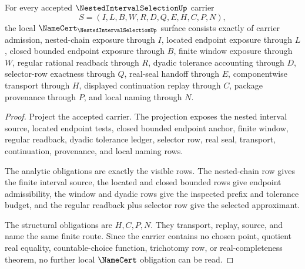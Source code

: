 \begin{theorem}
\label{thm:nested-interval-selection-namecert-obligations}
For every accepted $\NestedIntervalSelectionUp$ carrier
$$
S=(I,L,B,W,R,D,Q,E,H,C,P,N),
$$
the local $\NameCert_{\NestedIntervalSelectionUp}$ surface consists exactly of carrier admission, nested-chain exposure through $I$, located endpoint exposure through $L$, closed bounded endpoint exposure through $B$, finite window exposure through $W$, regular rational readback through $R$, dyadic tolerance accounting through $D$, selector-row exactness through $Q$, real-seal handoff through $E$, componentwise transport through $H$, displayed continuation replay through $C$, package provenance through $P$, and local naming through $N$.
\end{theorem}
\begin{proof}
Project the accepted carrier. The projection exposes the nested interval source, located endpoint tests, closed bounded endpoint anchor, finite window, regular readback, dyadic tolerance ledger, selector row, real seal, transport, continuation, provenance, and local naming rows.

The analytic obligations are exactly the visible rows. The nested-chain row gives the finite interval source, the located and closed bounded rows give endpoint admissibility, the window and dyadic rows give the inspected prefix and tolerance budget, and the regular readback plus selector row give the selected approximant.

The structural obligations are $H,C,P,N$. They transport, replay, source, and name the same finite route. Since the carrier contains no chosen point, quotient real equality, countable-choice function, trichotomy row, or real-completeness theorem, no further local $\NameCert$ obligation can be read.
\end{proof}

